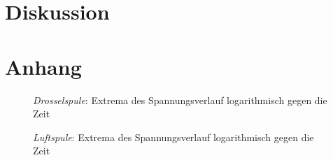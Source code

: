 \documentclass[12pt,a4paper,titlepage,headinclude,bibtotoc]{scrartcl}
\begin{document}
\section{Diskussion}
\label{sec:diskussion}

\section{Anhang}
\begin{figure}[!htb]
	\centering
	
	\caption{\textit{Drosselspule}: Extrema des Spannungsverlauf logarithmisch gegen die Zeit}
\end{figure}

\begin{figure}[!htb]
	\centering
	
	\caption{\textit{Luftspule}: Extrema des Spannungsverlauf logarithmisch gegen die Zeit}
\end{figure}
\end{document}
